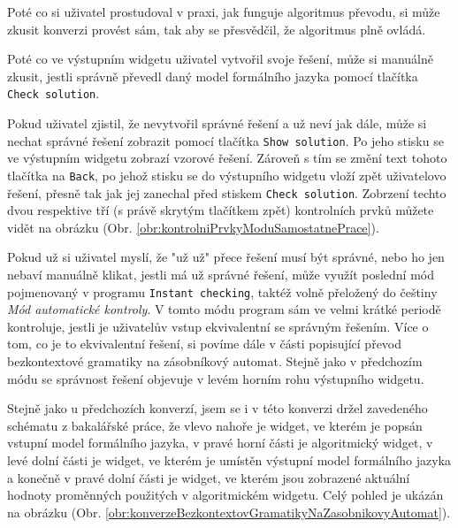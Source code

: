 
Poté co si uživatel prostudoval v praxi, jak funguje algoritmus převodu, si může zkusit konverzi provést sám, tak aby se přesvědčil, že algoritmus plně ovládá. 

Poté co ve výstupním widgetu uživatel vytvořil svoje řešení, může si manuálně zkusit, jestli správně převedl daný model formálního jazyka pomocí tlačítka \texttt{Check solution}. 

Pokud uživatel zjistil, že nevytvořil správné řešení a už neví jak dále, může si nechat správné řešení zobrazit pomocí tlačítka \texttt{Show solution}. Po jeho stisku se ve výstupním widgetu zobrazí vzorové řešení. Zároveň s tím se změní text tohoto tlačítka na \texttt{Back}, po jehož stisku se do výstupního widgetu vloží zpět uživatelovo řešení, přesně tak jak jej zanechal před stiskem \texttt{Check solution}. Zobrzení techto dvou respektive tří (s právě skrytým tlačítkem zpět) kontrolních prvků můžete vidět na obrázku (Obr. \ref{obr:kontrolniPrvkyModuSamostatnePrace}).



Pokud už si uživatel myslí, že "už už" přece řešení musí být správné, nebo ho jen nebaví manuálně klikat, jestli má už správné řešení, může využít poslední mód pojmenovaný v programu \texttt{Instant checking}, taktéž volně přeložený do češtiny \textit{Mód automatické kontroly}. V tomto módu program sám ve velmi krátké periodě kontroluje, jestli je uživatelův vstup ekvivalentní se správným řešením. Více o tom, co je to ekvivalentní řešení, si povíme dále v části popisující převod bezkontextové gramatiky na zásobníkový automat. Stejně jako v předchozím módu se správnost řešení objevuje v levém horním rohu výstupního widgetu. 


Stejně jako u předchozích konverzí, jsem se i v této konverzi držel zavedeného schématu z bakalářské práce, že vlevo nahoře je widget, ve kterém je popsán vstupní model formálního jazyka, v pravé horní části je algoritmický widget, v levé dolní části je widget, ve kterém je umístěn výstupní model formálního jazyka a konečně v pravé dolní části je widget, ve kterém jsou zobrazené aktuální hodnoty proměnných použitých v algoritmickém widgetu. Celý pohled je ukázán na obrázku (Obr. \ref{obr:konverzeBezkontextovGramatikyNaZasobnikovyAutomat}). 

